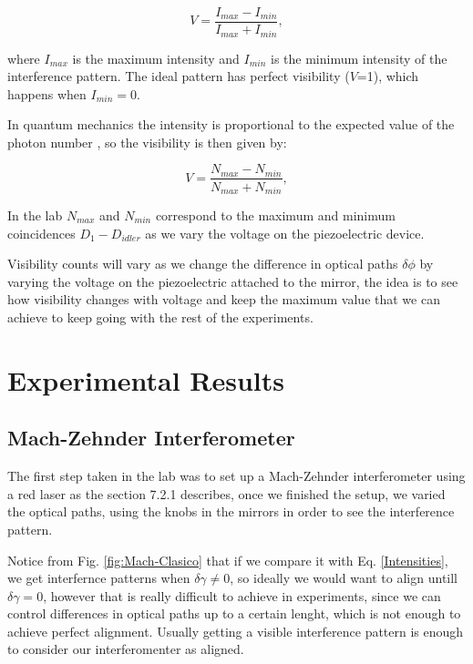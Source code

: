 \documentclass[12pt]{book}
\begin{document}
\begin{equation}
V=\frac{I_{max}-I_{min}}{I_{max}+I_{min}},
\end{equation}

where $I_{max}$ is the maximum intensity and $I_{min}$ is the minimum intensity of the interference pattern. The ideal pattern has perfect visibility ($V$=1), which happens when $I_{min}=0$.

In quantum mechanics the intensity is proportional to the expected value of the photon number \cite {glauber}, so the visibility is then given by:

\begin{equation}
V=\frac{N_{max}-N_{min}}{N_{max}+N_{min}},
\end{equation}

In the lab $N_{max}$ and $N_{min}$ correspond to the maximum and minimum coincidences $D_{1}-D_{idler}$ as we vary the voltage on the piezoelectric device.

Visibility counts will vary as we change the difference in optical paths $\delta\phi$ by varying the voltage on the piezoelectric attached to the mirror, the idea is to see how visibility changes with voltage and keep the maximum value that we can achieve to keep going with the rest of the experiments.
  
 \pagebreak

\chapter{Experimental Results}

\section{Mach-Zehnder Interferometer}

The first step taken in the lab was to set up a Mach-Zehnder interferometer using a red laser as the section 7.2.1 describes, once we finished the setup, we varied the optical paths, using the knobs in the mirrors in order to see the interference pattern.

Notice from Fig. \ref{fig:Mach-Clasico} that if we compare it with Eq. \ref{Intensities}, we get interfernce patterns when $\delta \gamma \neq 0$, so ideally we would want to align untill $\delta \gamma=0$, however that is really difficult to achieve in experiments, since we can control differences in optical paths up to a certain lenght, which is not enough to achieve perfect alignment. Usually getting a visible interference pattern is enough to consider our interferomenter as aligned. 
\end{document}

